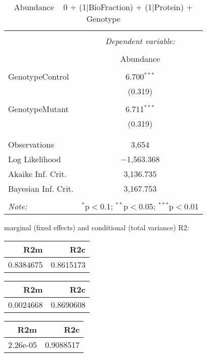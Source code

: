 \documentclass[11pt]{report}
\begin{document}
\begin{table}[!htbp] \centering 
  \caption{Abundance ~ 0 + (1|BioFraction) + (1|Protein) + Genotype} 
  \label{} 
\begin{tabular}{@{\extracolsep{5pt}}lc} 
\\[-1.8ex]\hline 
\hline \\[-1.8ex] 
 & \multicolumn{1}{c}{\textit{Dependent variable:}} \\ 
\cline{2-2} 
\\[-1.8ex] & Abundance \\ 
\hline \\[-1.8ex] 
 GenotypeControl & 6.700$^{***}$ \\ 
  & (0.319) \\ 
  & \\ 
 GenotypeMutant & 6.711$^{***}$ \\ 
  & (0.319) \\ 
  & \\ 
\hline \\[-1.8ex] 
Observations & 3,654 \\ 
Log Likelihood & $-$1,563.368 \\ 
Akaike Inf. Crit. & 3,136.735 \\ 
Bayesian Inf. Crit. & 3,167.753 \\ 
\hline 
\hline \\[-1.8ex] 
\textit{Note:}  & \multicolumn{1}{r}{$^{*}$p$<$0.1; $^{**}$p$<$0.05; $^{***}$p$<$0.01} \\ 
\end{tabular} 
\end{table} 
marginal (fixed effects) and conditional (total variance) R2:

\begin{tabular}{r|r}
\hline
R2m & R2c\\
\hline
0.8384675 & 0.8615173\\
\hline
\end{tabular}

\begin{tabular}{r|r}
\hline
R2m & R2c\\
\hline
0.0024668 & 0.8690608\\
\hline
\end{tabular}

\begin{tabular}{r|r}
\hline
R2m & R2c\\
\hline
2.26e-05 & 0.9088517\\
\hline
\end{tabular}
\end{document}
